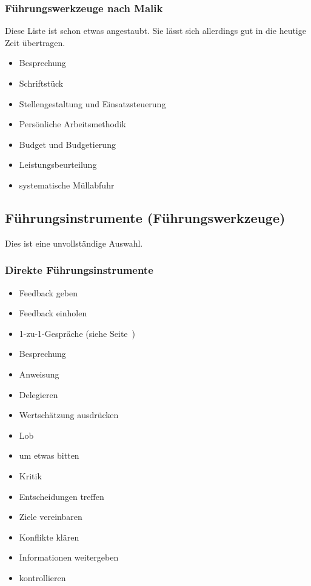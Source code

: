 \subsubsection{Führungswerkzeuge nach Malik}

Diese Liste ist schon etwas angestaubt. Sie lässt sich allerdings gut in die heutige Zeit übertragen.

\begin{itemize}
  \item Besprechung
  \item Schriftstück
  \item Stellengestaltung und Einsatzsteuerung
  \item Persönliche Arbeitsmethodik
  \item Budget und Budgetierung
  \item Leistungsbeurteilung
  \item systematische Müllabfuhr
\end{itemize}

\subsection{Führungsinstrumente (Führungswerkzeuge)}

Dies ist eine unvollständige Auswahl.

\subsubsection{Direkte Führungsinstrumente}

\begin{itemize}
  \item Feedback geben
  \item Feedback einholen
  \item 1-zu-1-Gespräche (siehe Seite~\pageref{1-zu-1})
  \item Besprechung
  \item Anweisung
  \item Delegieren
  \item Wertschätzung ausdrücken
  \item Lob
  \item um etwas bitten
  \item Kritik
  \item Entscheidungen treffen
  \item Ziele vereinbaren
  \item Konflikte klären
  \item Informationen weitergeben
  \item kontrollieren
\end{itemize}


